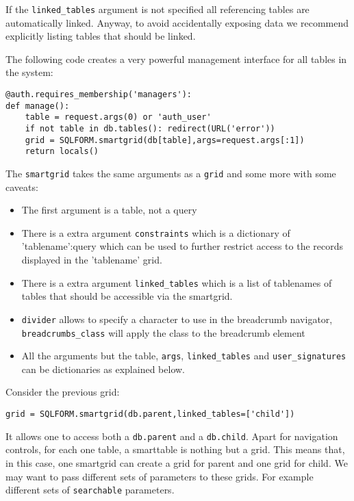 \documentclass[justified,sixbynine,notoc]{tufte-book}
\def\ft{\small\tt}
\begin{document}
\begin{fullwidth}
If the {\ft linked\_tables} argument is not specified all referencing tables are automatically linked. Anyway, to avoid accidentally exposing data we recommend explicitly listing tables that should be linked.

The following code creates a very powerful management interface for all tables in the system:

\begin{lstlisting}
@auth.requires_membership('managers'):
def manage():
    table = request.args(0) or 'auth_user'
    if not table in db.tables(): redirect(URL('error'))
    grid = SQLFORM.smartgrid(db[table],args=request.args[:1])
    return locals()
\end{lstlisting}

The {\ft smartgrid} takes the same arguments as a {\ft grid} and some more with some caveats:

\begin{itemize}
\item The first argument is a table, not a query

\item There is a extra argument {\ft constraints} which is a dictionary of 'tablename':query which can be used to further restrict access to the records displayed in the 'tablename' grid.

\item There is a extra argument {\ft linked\_tables} which is a list of tablenames of tables that should be accessible via the smartgrid.

\item {\ft divider} allows to specify a character to use in the breadcrumb navigator, {\ft breadcrumbs\_class} will apply the class to the breadcrumb element

\item All the arguments but the table, {\ft args}, {\ft linked\_tables} and {\ft user\_signatures} can be dictionaries as explained below.
\end{itemize}

Consider the previous grid:
\begin{lstlisting}
grid = SQLFORM.smartgrid(db.parent,linked_tables=['child'])
\end{lstlisting}
It allows one to access both a {\ft db.parent} and a {\ft db.child}. Apart for navigation controls, for each one table, a smarttable is nothing but a grid. This means that, in this case, one smartgrid can create a grid for parent and one grid for child. We may want to pass different sets of parameters to these grids. For example different sets of {\ft searchable} parameters.


\end{fullwidth}
\end{document}
